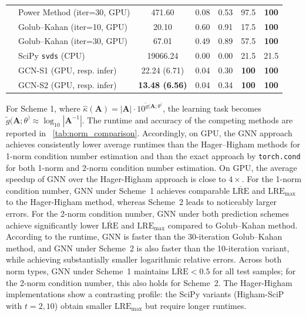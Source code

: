\documentclass[11pt,a4paper]{article}
\theoremstyle{plain}
\theoremstyle{definition}
\theoremstyle{remark}
\begin{document}
\begin{table}[ht]
{\begin{tabular}{llccccc}
& Power Method (iter=30, GPU) & 471.60 & 0.08 & 0.53 & 97.5 & \textbf{100} \\
& Golub--Kahan (iter=10, GPU) & 20.10 & 0.60 & 0.91 & 17.5 & \textbf{100} \\
& Golub--Kahan (iter=30, GPU) & 67.01 & 0.49 & 0.89 & 57.5 & \textbf{100} \\
& SciPy \texttt{svds} (CPU) & 19066.24 & 0.00 & 0.00 & 21.5 & 21.5 \\
& GCN-S1 (GPU, resp. infer) & 22.24 (6.71) & 0.04 & 0.30 & \textbf{100} & \textbf{100} \\
& GCN-S2 (GPU, resp. infer) & \textbf{13.48 (6.56)} & 0.04 & 0.34 & \textbf{100} & \textbf{100} \\
\bottomrule
\end{tabular}%
}
\end{table}



For Scheme 1, where
$\hat{\kappa}(\mathbf{A}) = |\mathbf{A}| \cdot 10^{\tilde{g}(\mathbf{A}; \theta^)}$, the learning task becomes $\tilde{g}(\mathbf{A}; \theta^) \approx \log_{10} |\mathbf{A}^{-1}|$. The runtime and accuracy of the competing methods are reported in \tablename~\ref{tab:norm_comparison}.
Accordingly, on GPU, the GNN approach achieves consistently lower average runtimes than the Hager--Higham methods for 1-norm condition number estimation and than the exact approach by \texttt{torch.cond} for both 1-norm and 2-norm condition number estimation. On GPU, the average speedup of GNN over the Hager-Higham approach is close to $4\times$. For the 1-norm condition number, GNN under Scheme~1 achieves comparable $\overline{\mathrm{LRE}}$ and $\mathrm{LRE}_{\max}$ to the Hager-Higham method, whereas Scheme~2 leads to noticeably larger errors. For the 2-norm condition number, GNN under both prediction schemes achieve significantly lower  $\overline{\mathrm{LRE}}$ and $\mathrm{LRE}_{\max}$  compared to Golub--Kahan method. According to the runtime, GNN is faster than the 30-iteration Golub--Kahan method, and GNN under Scheme~2 is also faster than the 10-iteration variant, while achieving substantially smaller logarithmic relative errors. Across both norm types, GNN under Scheme~1 maintains $\overline{\mathrm{LRE}} < 0.5$ for all test samples; for the 2-norm condition number, this also holds for Scheme~2. The Hager-Higham implementations show a contrasting profile: the SciPy variants (Higham-SciP with $t=2, 10$) obtain smaller $\mathrm{LRE}_{\max}$ but require longer runtimes.
\end{document}
